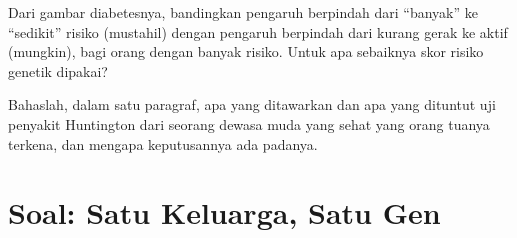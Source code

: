 \begin{exercise}[$\star\star\star$]\label{exo:g11:genes-and-disease:14}
Dari gambar diabetesnya, bandingkan pengaruh berpindah dari ``banyak''
ke ``sedikit''  risiko (mustahil) dengan pengaruh berpindah dari
kurang gerak ke aktif (mungkin), bagi orang dengan banyak  risiko.
Untuk apa sebaiknya skor risiko genetik dipakai?
\end{exercise}

\begin{exercise}[$\star\star\star$]\label{exo:g11:genes-and-disease:15}
Bahaslah, dalam satu paragraf, apa yang ditawarkan dan apa yang
dituntut uji penyakit Huntington dari seorang dewasa muda yang sehat
yang orang tuanya terkena, dan mengapa keputusannya ada padanya.
\end{exercise}

\section{Soal: Satu Keluarga, Satu Gen}

